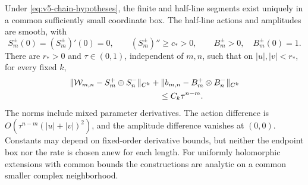 \begin{theorem}
\label{thm:v5-chain-factorization}
Under \eqref{eq:v5-chain-hypotheses}, the finite and half-line segments
exist uniquely in a common sufficiently small coordinate box. The
half-line actions and amplitudes are smooth, with
\[
 S_m^\pm(0)=(S_m^\pm)'(0)=0,\qquad
 (S_m^\pm)''\ge c_*>0,\qquad B_m^\pm>0,\quad B_m^\pm(0)=1.
\]
There are $r_*>0$ and $\tau\in(0,1)$, independent of $m,n$, such that
on $|u|,|v|<r_*$, for every fixed $k$,
\begin{equation}\label{eq:v5-chain-factorization}
 \begin{split}
 &\|\mathcal W_{m,n}-S_m^+\oplus S_n^-\|_{C^k}
   +\|b_{m,n}-B_m^+\otimes B_n^-\|_{C^k}\\
 &\hspace{38mm}\le C_k\tau^{n-m}.
 \end{split}
\end{equation}
The norms include mixed parameter derivatives. The action difference is
$O(\tau^{n-m}(|u|+|v|)^2)$, and the amplitude difference vanishes at
$(0,0)$. Constants may depend on fixed-order derivative bounds, but
neither the endpoint box nor the rate is chosen anew for each length.
For uniformly holomorphic extensions with common bounds the
constructions are analytic on a common smaller complex neighborhood.
\end{theorem}

